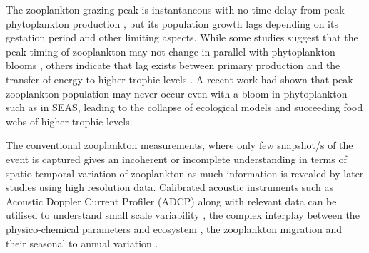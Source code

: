 \documentclass{article}
\begin{document}
	The zooplankton grazing peak is instantaneous with no time delay from peak phytoplankton production \citep{li2000determines}, but its population growth lags \citep{rehim2012dynamical, almen2020temperature} depending on its gestation period and other limiting aspects. While some studies suggest that the peak timing of zooplankton may not change in parallel with phytoplankton blooms \citep{winder2004climatic}, others indicate that lag exists between primary production and the transfer of energy to higher trophic levels \citep{brock1992interannual, brock1991phytoplankton}. A recent work \citep{aparna2022seasonal} had shown that peak zooplankton population may never occur even with a bloom in phytoplankton such as in SEAS, leading to the collapse of ecological models and succeeding food webs of higher trophic levels.  
	
	The conventional zooplankton measurements, where only few snapshot/s of the event is captured gives an incoherent or incomplete understanding in terms of spatio-temporal variation of zooplankton \citep{ramamurthy1965studies, piontkovski1995spatial, madhupratap1992zooplankton,madhupratap1996lack,wishner1998mesozooplankton,khandagale2022seasonal} as much information is revealed by later studies \citep{jyothibabu2010re, vijith2016consequences, shankar2019role, aparna2022seasonal} using high resolution data. Calibrated acoustic instruments such as Acoustic Doppler Current Profiler (ADCP) along with relevant data can be utilised to understand small scale variability \citep{nair1999arabian, edvardsen2003assessing, smith2005mesozooplankton, smeti2015spatial, kang2024acoustic}, the complex interplay between the physico-chemical parameters and ecosystem \citep{jiang2007temporal, potiris2018acoustic, shankar2019role, aparna2022seasonal, nie2023influence}, the zooplankton migration \citep{inoue2016diel,ursella2018evidence, ursella2021diel} and their seasonal to annual variation \citep{jiang2007temporal, hobbs2021marine,liu2022seasonal, aparna2022seasonal}.
	
\end{document}
